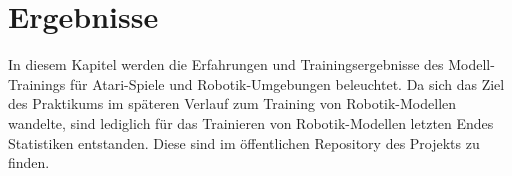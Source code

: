 
\chapter{Ergebnisse}
\label{ch:Evaluation}
In diesem Kapitel werden die Erfahrungen und Trainingsergebnisse des Modell-Trainings für Atari-Spiele und Robotik-Umgebungen beleuchtet. Da sich das Ziel des Praktikums im späteren Verlauf zum Training von Robotik-Modellen wandelte, sind lediglich für das Trainieren von Robotik-Modellen letzten Endes Statistiken entstanden. Diese sind im öffentlichen Repository des Projekts zu finden.
